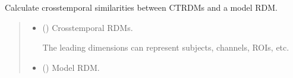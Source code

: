 \documentclass[letterpaper,10pt,english]{sphinxhowto}
\begin{document}
\begin{fulllineitems}
\label{\detokenize{ctcorr_cal:neurora.ctcorr_cal.ctsim_ctrdms_cal}}
\pysigstartsignatures
{}
\pysigstopsignatures
\sphinxAtStartPar
Calculate cross\sphinxhyphen{}temporal similarities between CTRDMs and a model RDM.
\begin{quote}\begin{description}
\begin{itemize}
\item {} 
\sphinxAtStartPar
{} (\sphinxstyleliteralemphasis{\sphinxupquote{, }}\sphinxstyleliteralemphasis{\sphinxupquote{ {[}}}\sphinxstyleliteralemphasis{\sphinxupquote{, }}\sphinxstyleliteralemphasis{\sphinxupquote{, }}\sphinxstyleliteralemphasis{\sphinxupquote{, }}\sphinxstyleliteralemphasis{\sphinxupquote{{]} or }}\sphinxstyleliteralemphasis{\sphinxupquote{{[}}}\sphinxstyleliteralemphasis{\sphinxupquote{, }}\sphinxstyleliteralemphasis{\sphinxupquote{, }}\sphinxstyleliteralemphasis{\sphinxupquote{, }}\sphinxstyleliteralemphasis{\sphinxupquote{, }}\sphinxstyleliteralemphasis{\sphinxupquote{{]}}}) \textendash{} 
\sphinxAtStartPar
Cross\sphinxhyphen{}temporal RDMs.

\sphinxAtStartPar
The leading dimensions can represent subjects, channels, ROIs, etc.


\item {} 
\sphinxAtStartPar
{} (\sphinxstyleliteralemphasis{\sphinxupquote{, }}\sphinxstyleliteralemphasis{\sphinxupquote{ {[}}}\sphinxstyleliteralemphasis{\sphinxupquote{, }}\sphinxstyleliteralemphasis{\sphinxupquote{{]}}}) \textendash{} Model RDM.


\end{itemize}
\end{description}
\end{quote}
\end{fulllineitems}
\end{document}
